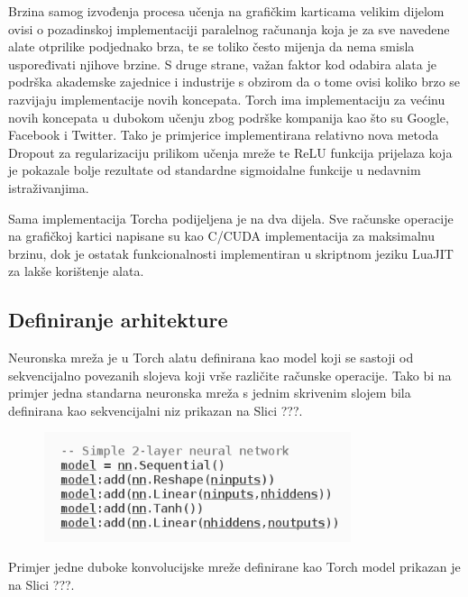 \documentclass[lmodern, utf8, diplomski, numeric]{fer}
\begin{document}
Brzina samog izvođenja procesa učenja na grafičkim karticama velikim dijelom ovisi o pozadinskoj implementaciji paralelnog računanja koja je za sve navedene alate otprilike podjednako brza, te se toliko često mijenja da nema smisla uspoređivati njihove brzine. S druge strane, važan faktor kod odabira alata je podrška akademske zajednice i industrije s obzirom da o tome ovisi koliko brzo se razvijaju implementacije novih koncepata. Torch ima implementaciju za većinu novih koncepata u dubokom učenju zbog podrške kompanija kao što su Google, Facebook i Twitter.  Tako je primjerice implementirana relativno nova metoda Dropout za regularizaciju prilikom učenja mreže te ReLU funkcija prijelaza koja je pokazale bolje rezultate od standardne sigmoidalne funkcije u nedavnim istraživanjima.

Sama implementacija Torcha podijeljena je na dva dijela. Sve računske operacije na grafičkoj kartici napisane su kao C/CUDA implementacija za maksimalnu brzinu, dok je ostatak funkcionalnosti implementiran u skriptnom jeziku LuaJIT za lakše korištenje alata.  

\subsection{Definiranje arhitekture}
	
Neuronska mreža je u Torch alatu definirana kao model koji se sastoji od sekvencijalno povezanih slojeva koji vrše različite računske operacije.
Tako bi na primjer jedna standarna neuronska mreža s jednim skrivenim slojem bila definirana kao sekvencijalni niz prikazan na Slici ???. 

\begin{figure}[ht!]
\centering
\includegraphics[width=9cm]{slike/nn_model.png}
\caption{}
\end{figure}

Primjer jedne duboke konvolucijske mreže definirane kao Torch model prikazan je na Slici ???.
\end{document}
